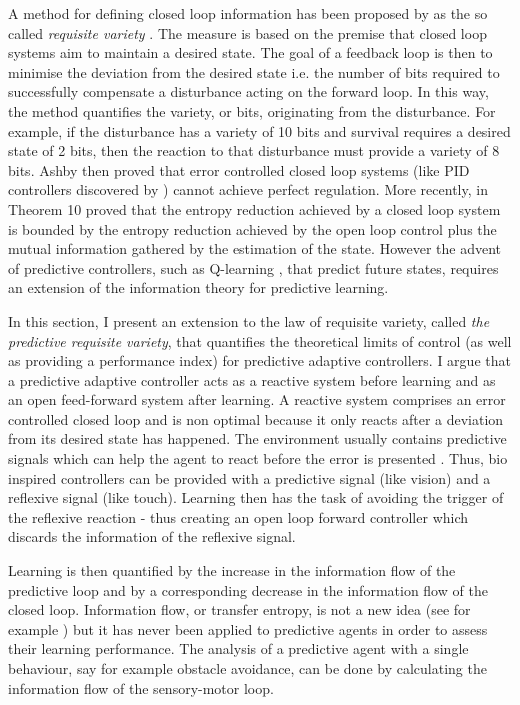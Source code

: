 A method for defining closed loop information has been proposed by \citet{Ashby1956:IntroCybernetics}
as the so called \textit{requisite variety} .
The measure is based on the premise that closed loop systems aim to maintain
a desired state.
The goal of a feedback loop is then to minimise the deviation from the desired
state i.e. the number of bits required to successfully
compensate a disturbance acting on the forward loop. In this
way, the method quantifies the variety, or bits, originating from the
disturbance. For example, if the disturbance has a variety of 10 bits and
survival requires a desired state of 2 bits, then the reaction to that disturbance
must provide a variety of 8 bits.
Ashby then proved that error controlled closed loop systems (like PID controllers 
discovered by \citealt{PID}) cannot achieve perfect regulation.
More recently, \citealt{PhysRevLett.84.1156} in Theorem 10 proved
that the entropy reduction achieved by a closed loop system
is bounded by the entropy reduction achieved by the open loop control plus
the mutual information gathered by the estimation of the state.
However the advent of predictive controllers, such as Q-learning \citep{TD},
that predict future states, requires an extension of the information theory for
predictive learning.

In this section, I present an extension to
the law of requisite variety, called \textit{the predictive requisite variety},
that quantifies the theoretical limits of control (as well as providing a performance index)
for predictive adaptive controllers.
I argue that a predictive adaptive controller acts as a reactive system before learning
and as an open feed-forward system after learning.
A reactive system comprises an error controlled closed
loop and is non optimal because it only reacts after a
deviation from its desired state has happened.
The environment usually contains predictive signals which can help the agent to
react before the error is presented \citep{Verschure2003}. Thus, bio inspired controllers
can be provided with a predictive signal (like vision) and a reflexive signal (like touch).
Learning then has the task of avoiding the trigger of the reflexive reaction -
thus creating an open loop forward controller which discards
the information of the reflexive signal.

Learning is then quantified by the increase in the information flow of the predictive
loop and by a corresponding decrease in the information flow of the closed loop.
Information flow, or transfer entropy, is not a new idea (see for
example \citep{infoFlow,transferEntropy}) but it has never been applied to
predictive agents in order to assess their learning performance.
The analysis of a predictive agent with a single behaviour, say for
example obstacle avoidance, can be done by calculating the information flow of the
sensory-motor loop.

